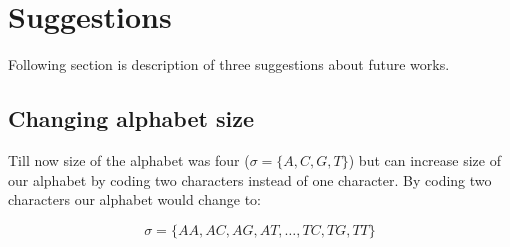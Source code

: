 \section{Suggestions}

Following section is description of three suggestions about future works.

\subsection{Changing alphabet size}
Till now size of the alphabet was four ($\sigma = \{A,C,G,T\}$) but can increase size of our alphabet by coding two characters instead of one character. By coding two characters our alphabet would change to:

\begin{equation}
\nonumber
\sigma = \{ AA, AC, AG, AT, \dots, TC, TG, TT \}
\end{equation}
  